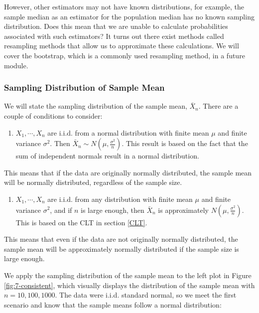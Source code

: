 \documentclass[
]{book}
\providecommand{\tightlist}{%
  \setlength{\itemsep}{0pt}\setlength{\parskip}{0pt}}
\begin{document}
However, other estimators may not have known distributions, for example, the sample median as an estimator for the population median has no known sampling distribution. Does this mean that we are unable to calculate probabilities associated with such estimators? It turns out there exist methods called resampling methods that allow us to approximate these calculations. We will cover the bootstrap, which is a commonly used resampling method, in a future module.

\hypertarget{sampdistmean}{%
\subsubsection{Sampling Distribution of Sample Mean}\label{sampdistmean}}

We will state the sampling distribution of the sample mean, \(\bar{X}_n\). There are a couple of conditions to consider:

\begin{enumerate}
\def\labelenumi{\arabic{enumi}.}
\tightlist
\item
  \(X_1, \cdots, X_n\) are i.i.d. from a normal distribution with finite mean \(\mu\) and finite variance \(\sigma^2\). Then \(\bar{X}_n \sim N(\mu, \frac{\sigma^2}{n})\). This result is based on the fact that the sum of independent normals result in a normal distribution.
\end{enumerate}

This means that if the data are originally normally distributed, the sample mean will be normally distributed, regardless of the sample size.

\begin{enumerate}
\def\labelenumi{\arabic{enumi}.}
\setcounter{enumi}{1}
\tightlist
\item
  \(X_1, \cdots, X_n\) are i.i.d. from any distribution with finite mean \(\mu\) and finite variance \(\sigma^2\), and if \(n\) is large enough, then \(\bar{X}_n\) is approximately \(N(\mu, \frac{\sigma^2}{n})\). This is based on the CLT in section \ref{CLT}.
\end{enumerate}

This means that even if the data are not originally normally distributed, the sample mean will be approximately normally distributed if the sample size is large enough.

We apply the sampling distribution of the sample mean to the left plot in Figure \ref{fig:7-consistent}, which visually displays the distribution of the sample mean with \(n=10, 100, 1000\). The data were i.i.d. standard normal, so we meet the first scenario and know that the sample means follow a normal distribution:
\end{document}
